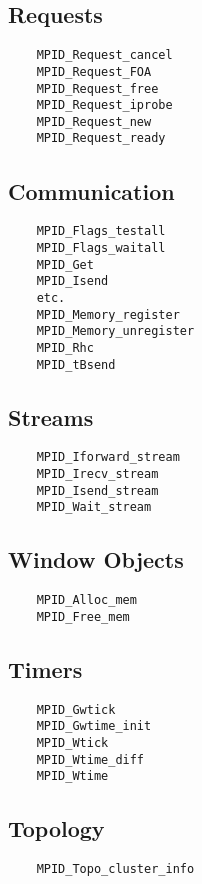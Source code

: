\documentclass{article}
\begin{document}
\subsection{Requests}
\begin{verbatim}
    MPID_Request_cancel
    MPID_Request_FOA
    MPID_Request_free
    MPID_Request_iprobe
    MPID_Request_new
    MPID_Request_ready
\end{verbatim}

\subsection{Communication}
\begin{verbatim}
    MPID_Flags_testall
    MPID_Flags_waitall
    MPID_Get
    MPID_Isend
    etc.
    MPID_Memory_register
    MPID_Memory_unregister
    MPID_Rhc
    MPID_tBsend
\end{verbatim}

\subsection{Streams}
\begin{verbatim}
    MPID_Iforward_stream
    MPID_Irecv_stream
    MPID_Isend_stream
    MPID_Wait_stream
\end{verbatim}

\subsection{Window Objects}
\begin{verbatim}
    MPID_Alloc_mem
    MPID_Free_mem
\end{verbatim}

\subsection{Timers}
\begin{verbatim}
    MPID_Gwtick
    MPID_Gwtime_init
    MPID_Wtick
    MPID_Wtime_diff
    MPID_Wtime
\end{verbatim}

\subsection{Topology}
\begin{verbatim}
    MPID_Topo_cluster_info
\end{verbatim}
\end{document}
